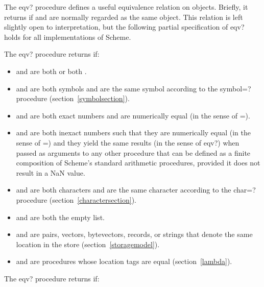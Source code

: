 \begin{entry}{
}

The {\cf eqv?} procedure defines a useful equivalence relation on objects.
Briefly, it returns \schtrue{} if  and  are
normally regarded as the same object.  This relation is left slightly
open to interpretation, but the following partial specification of
{\cf eqv?} holds for all implementations of Scheme.

The {\cf eqv?} procedure returns \schtrue{} if:

\begin{itemize}
\item {} and  are both \schtrue{} or both \schfalse.

\item {} and  are both symbols and are the same
symbol according to the {\cf symbol=?} procedure
(section~\ref{symbolsection}).

\item {} and  are both exact numbers and
are numerically equal (in the sense of {\cf =}).

\item {} and  are both inexact numbers such that
they are numerically equal (in the sense of {\cf =})
and they yield the same results (in the sense of {\cf eqv?})
when passed as arguments to any other procedure
that can be defined as a finite composition of Scheme's standard
arithmetic procedures, provided it does not result in a NaN value.

\item {} and  are both characters and are the same
character according to the {\cf char=?} procedure
(section~\ref{charactersection}).

\item {} and  are both the empty list.

\item {} and  are pairs, vectors, bytevectors, records,
or strings that denote the same location in the store
(section~\ref{storagemodel}).

\item {} and  are procedures whose location tags are
equal (section~\ref{lambda}).
\end{itemize}

The {\cf eqv?} procedure returns \schfalse{} if:


\end{entry}
